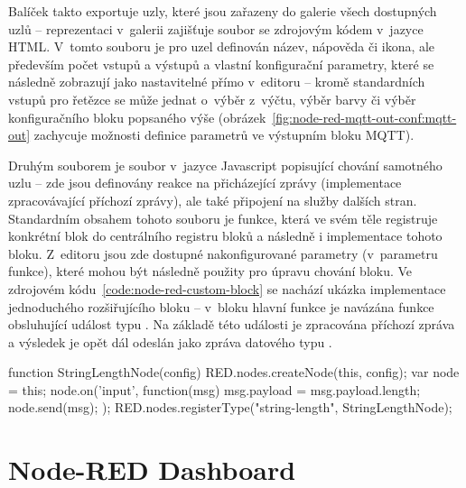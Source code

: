 Balíček takto exportuje uzly, které jsou zařazeny do galerie všech dostupných uzlů -- reprezentaci v~galerii zajišťuje
soubor se zdrojovým kódem v~jazyce HTML.
V~tomto souboru je pro uzel definován název, nápověda či ikona, ale především počet vstupů a výstupů a vlastní
konfigurační parametry, které se následně zobrazují jako nastavitelné přímo v~editoru -- kromě standardních vstupů
pro řetězce se může jednat o~výběr z~výčtu, výběr barvy či výběr konfiguračního bloku popsaného výše
(obrázek~\ref{fig:node-red-mqtt-out-conf:mqtt-out} zachycuje možnosti definice parametrů ve výstupním bloku MQTT).

Druhým souborem je soubor v~jazyce Javascript popisující chování samotného uzlu -- zde jsou definovány reakce na
přicházející zprávy (implementace zpracovávající příchozí zprávy), ale také připojení na služby dalších stran.
Standardním obsahem tohoto souboru je funkce, která ve svém těle registruje konkrétní blok do centrálního registru
bloků a následně i implementace tohoto bloku.
Z~editoru jsou zde dostupné nakonfigurované parametry (v~parametru funkce), které mohou být následně použity pro
úpravu chování bloku.
Ve zdrojovém kódu~\ref{code:node-red-custom-block} se nachází ukázka implementace jednoduchého rozšiřujícího bloku --
v~bloku hlavní funkce je navázána funkce obsluhující událost typu .
Na základě této události je zpracována příchozí zpráva a výsledek je opět dál odeslán jako zpráva datového typu
.

\begin{code}[%
    caption={Ukázka implementace vlastního rozšiřujícího bloku do nástroje Node-RED -- uzel s~jedním vstupem a
výstupem, jehož funkcí je určení délky příchozí zprávy (řetězce).
\emph{Implementace pro jednoduchost neobsahuje kontrolu datových typů či práci s~konfiguračními parametry uzlu.}},
    label=code:node-red-custom-block,
    language=Javascript
]
function StringLengthNode(config) {
    RED.nodes.createNode(this, config);
    var node = this;
    node.on('input', function(msg) {
        msg.payload = msg.payload.length;
        node.send(msg);
    });
}
RED.nodes.registerType("string-length", StringLengthNode);
\end{code}

\section{Node-RED Dashboard}\label{sec:node-red-dashboard}

